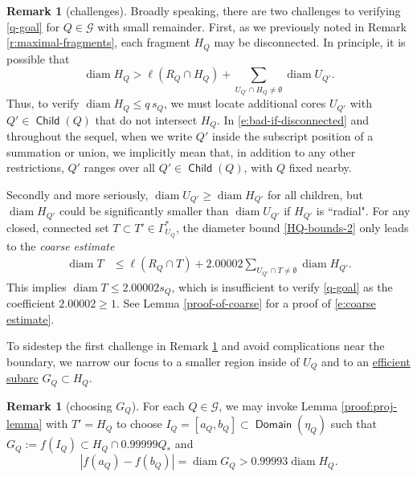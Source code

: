 \documentclass[12pt]{amsart}
\numberwithin{equation}{section}
\theoremstyle{plain}
\theoremstyle{definition}
\newtheorem{remark}[theorem]{Remark}
\newcommand{\diam}{\mathop\mathrm{diam}\nolimits}
\newcommand{\Domain}{\mathop\mathsf{Domain}\nolimits}
\newcommand{\Child}{\mathop\mathsf{Child}\nolimits}
\numberwithin{figure}{section}
\begin{document}
\begin{remark}[challenges] \label{remark:challenges}Broadly speaking, there are two challenges to verifying \eqref{q-goal} for $Q\in\mathscr{G}$ with small remainder. First, as we previously noted in Remark \ref{r:maximal-fragments}, each fragment $H_Q$ may be disconnected. In principle, it is possible that
\begin{equation}\label{e:bad-if-disconnected}
\diam H_Q > \ell(R_Q \cap H_Q) + \sum_{U_{Q'} \cap H_Q \neq \emptyset} \diam U_{Q'}.
\end{equation} Thus, to verify $\diam H_Q \leq q\, s_Q$, we must locate additional cores $U_{Q'}$ with $Q'\in\Child(Q)$ that do not intersect $H_Q$. In \eqref{e:bad-if-disconnected} and throughout the sequel, when we write $Q'$ inside the subscript position of a summation or union, we implicitly mean that, in addition to any other restrictions, $Q'$ ranges over all $Q'\in\Child(Q)$, with $Q$ fixed nearby.

Secondly and more seriously, $\diam U_{Q'} \geq \diam H_{Q'}$ for all children, but $\diam H_{Q'}$ could be significantly smaller than $\diam U_{Q'}$ if $H_{Q'}$ is ``radial".  For any closed, connected set $T \subset T' \in \Gamma^*_{U_Q}$, the diameter bound \eqref{HQ-bounds-2}
only leads to the \emph{coarse estimate}
    \begin{align}\label{e:coarse estimate}
        \diam T & \leq \ell(R_Q \cap T) + 2.00002\sum_{U_{Q'} \cap T \neq \emptyset}\diam H_{Q'}.
    \end{align}
This implies $\diam T \le 2.00002 s_Q$, which is insufficient to verify \eqref{q-goal} as the coefficient $2.00002\geq 1$. See Lemma \ref{proof-of-coarse} for a proof of \eqref{e:coarse estimate}.\end{remark}

To sidestep the first challenge in Remark \ref{remark:challenges} and avoid complications near the boundary, we narrow our focus to a smaller region inside of $U_Q$ and to an \hyperref[def:subarc]{efficient subarc} $G_Q\subset H_Q$.

\begin{remark}[choosing $G_Q$] \label{proj-lemma} For each $Q\in\mathscr{G}$, we may invoke Lemma \ref{proof:proj-lemma} with $T'=H_Q$ to choose $I_Q=[a_Q,b_Q]\subset\Domain(\eta_Q)$ such that $G_Q:=f(I_Q)\subset H_Q\cap 0.99999Q_*$ and
\begin{equation}\label{H-G diam est}|f(a_Q)-f(b_Q)|=\diam G_Q>0.99993\diam H_Q.\end{equation}
\end{remark}
\end{document}
